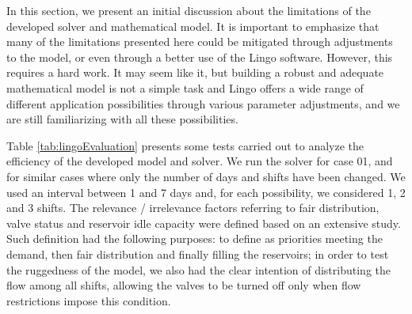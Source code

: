 \documentclass{singlecol}
\theoremstyle{TH}{
\newtheorem{lemma}{Lemma}
\newtheorem{theorem}[lemma]{Theorem}
\newtheorem{corrolary}[lemma]{Corrolary}
\newtheorem{conjecture}[lemma]{Conjecture}
\newtheorem{proposition}[lemma]{Proposition}
\newtheorem{claim}[lemma]{Claim}
\newtheorem{stheorem}[lemma]{Wrong Theorem}
\newtheorem{algorithm}{Algorithm}
}
\theoremstyle{THrm}{
\newtheorem{definition}{Definition}[section]
\newtheorem{question}{Question}[section]
\newtheorem{remark}{Remark}
\newtheorem{scheme}{Scheme}
}
\theoremstyle{THhit}{
\newtheorem{case}{Case}[section]
}
\begin{document}
In this section, we present an initial discussion about the limitations of the developed solver and mathematical model. It is important to emphasize that many of the limitations presented here could be mitigated through adjustments to the model, or even through a better use of the Lingo software. However, this requires a hard work. It may seem like it, but building a robust and adequate mathematical model is not a simple task and Lingo offers a wide range of different application possibilities through various parameter adjustments, and we are still familiarizing with all these possibilities. 

Table \ref{tab:lingoEvaluation} presents some tests carried out to analyze the efficiency of the developed model and solver. We run the solver for case 01, and for similar cases where only the number of days and shifts have been changed. We used an interval between 1 and 7 days and, for each possibility, we considered 1, 2 and 3 shifts. The relevance / irrelevance factors referring to fair distribution, valve status and reservoir idle capacity were defined based on an extensive study. Such definition had the following purposes: to define as priorities meeting the demand, then fair distribution and finally filling the reservoirs; in order to test the ruggedness of the model, we also had the clear intention of distributing the flow among all shifts, allowing the valves to be turned off only when flow restrictions impose this condition. 
\end{document}
